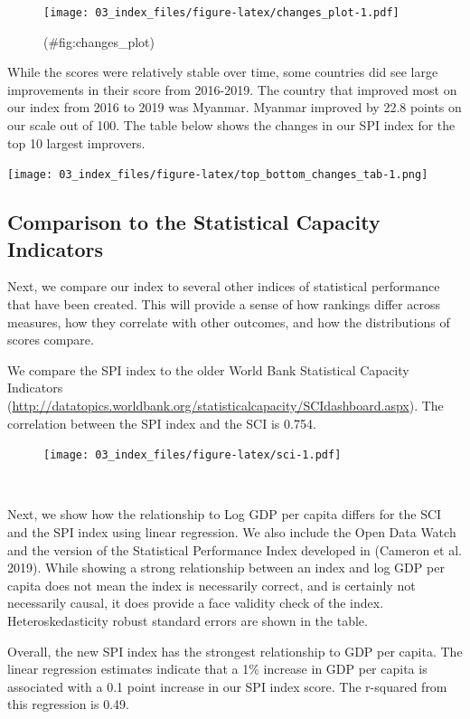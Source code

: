 \documentclass[
]{article}
\begin{document}
\begin{figure}
\centering
\texttt{[image: 03\_index\_files/figure-latex/changes\_plot-1.pdf]}
\caption{(\#fig:changes\_plot)~}
\end{figure}

While the scores were relatively stable over time, some countries did see large improvements in their score from 2016-2019. The country that improved most on our index from 2016 to 2019 was Myanmar. Myanmar improved by 22.8 points on our scale out of 100. The table below shows the changes in our SPI index for the top 10 largest improvers.

\texttt{[image: 03\_index\_files/figure-latex/top\_bottom\_changes\_tab-1.png]}

\hypertarget{comparison-to-the-statistical-capacity-indicators}{%
\subsection{Comparison to the Statistical Capacity Indicators}\label{comparison-to-the-statistical-capacity-indicators}}

Next, we compare our index to several other indices of statistical performance that have been created. This will provide a sense of how rankings differ across measures, how they correlate with other outcomes, and how the distributions of scores compare.

We compare the SPI index to the older World Bank Statistical Capacity Indicators (\url{http://datatopics.worldbank.org/statisticalcapacity/SCIdashboard.aspx}). The correlation between the SPI index and the SCI is 0.754.

\begin{figure}
\centering
\texttt{[image: 03\_index\_files/figure-latex/sci-1.pdf]}
\caption{\label{fig:sci}~}
\end{figure}

Next, we show how the relationship to Log GDP per capita differs for the SCI and the SPI index using linear regression. We also include the Open Data Watch and the version of the Statistical Performance Index developed in (Cameron et al. 2019). While showing a strong relationship between an index and log GDP per capita does not mean the index is necessarily correct, and is certainly not necessarily causal, it does provide a face validity check of the index. Heteroskedasticity robust standard errors are shown in the table.

Overall, the new SPI index has the strongest relationship to GDP per capita. The linear regression estimates indicate that a 1\% increase in GDP per capita is associated with a 0.1 point increase in our SPI index score. The r-squared from this regression is 0.49.
\end{document}
